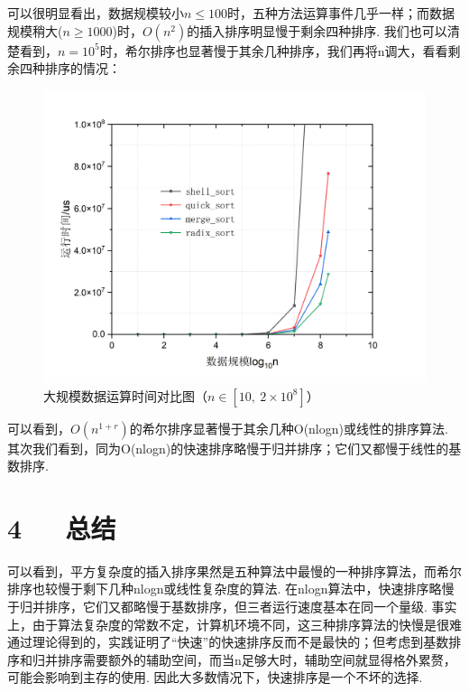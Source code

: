 \documentclass[UTF8]{ctexart}
\begin{document}
可以很明显看出，数据规模较小$n\leq 100$时，五种方法运算事件几乎一样；而数据规模稍大($n\geq 1000$)时，$O(n^2)$的插入排序明显慢于剩余四种排序. 我们也可以清楚看到，$n=10^5$时，希尔排序也显著慢于其余几种排序，我们再将n调大，看看剩余四种排序的情况：
\begin{figure}[H]\begin{center}
	\includegraphics[scale=0.5]{graph2.png}
\caption{大规模数据运算时间对比图（$n\in [10,\ 2\times 10^8]$）}
\end{center}\end{figure}
可以看到，$O(n^{1+r})$的希尔排序显著慢于其余几种O(nlogn)或线性的排序算法. 其次我们看到，同为O(nlogn)的快速排序略慢于归并排序；它们又都慢于线性的基数排序.


\section*{4\ \ \ 总结}
可以看到，平方复杂度的插入排序果然是五种算法中最慢的一种排序算法，而希尔排序也较慢于剩下几种nlogn或线性复杂度的算法. 在nlogn算法中，快速排序略慢于归并排序，它们又都略慢于基数排序，但三者运行速度基本在同一个量级. 事实上，由于算法复杂度的常数不定，计算机环境不同，这三种排序算法的快慢是很难通过理论得到的，实践证明了“快速”的快速排序反而不是最快的；但考虑到基数排序和归并排序需要额外的辅助空间，而当n足够大时，辅助空间就显得格外累赘，可能会影响到主存的使用. 因此大多数情况下，快速排序是一个不坏的选择.
\end{document}
